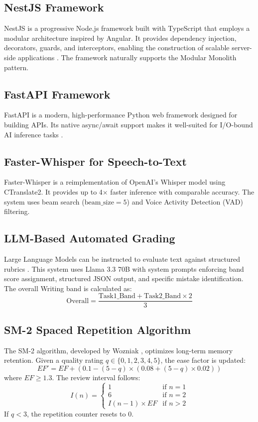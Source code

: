 \documentclass[conference]{IEEEtran}
\begin{document}
\subsection{NestJS Framework}
NestJS is a progressive Node.js framework built with TypeScript that employs a modular architecture inspired by Angular. It provides dependency injection, decorators, guards, and interceptors, enabling the construction of scalable server-side applications \cite{nestjs_docs}. The framework naturally supports the Modular Monolith pattern.

\subsection{FastAPI Framework}
FastAPI is a modern, high-performance Python web framework designed for building APIs. Its native async/await support makes it well-suited for I/O-bound AI inference tasks \cite{fastapi_docs}.

\subsection{Faster-Whisper for Speech-to-Text}
Faster-Whisper \cite{faster_whisper} is a reimplementation of OpenAI's Whisper model \cite{whisper_paper} using CTranslate2. It provides up to 4$\times$ faster inference with comparable accuracy. The system uses beam search ($\text{beam\_size}=5$) and Voice Activity Detection (VAD) filtering.

\subsection{LLM-Based Automated Grading}
Large Language Models can be instructed to evaluate text against structured rubrics \cite{gpt3}. This system uses Llama 3.3 70B with system prompts enforcing band score assignment, structured JSON output, and specific mistake identification. The overall Writing band is calculated as:
\begin{equation}
    \text{Overall} = \frac{\text{Task1\_Band} + \text{Task2\_Band} \times 2}{3}
\end{equation}

\subsection{SM-2 Spaced Repetition Algorithm}
The SM-2 algorithm, developed by Wozniak \cite{sm2}, optimizes long-term memory retention. Given a quality rating $q \in \{0, 1, 2, 3, 4, 5\}$, the ease factor is updated:
\begin{equation}
    EF' = EF + (0.1 - (5-q) \times (0.08 + (5-q) \times 0.02))
\end{equation}
where $EF \geq 1.3$. The review interval follows:
\begin{equation}
    I(n) = \begin{cases} 1 & \text{if } n = 1 \\ 6 & \text{if } n = 2 \\ I(n-1) \times EF & \text{if } n > 2 \end{cases}
\end{equation}
If $q < 3$, the repetition counter resets to 0.
\end{document}
